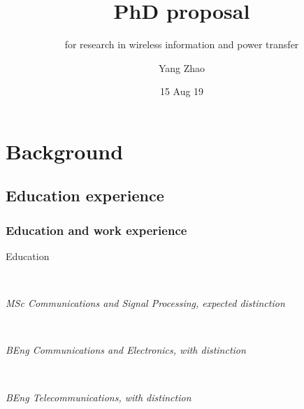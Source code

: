 \documentclass{beamer}
\title{PhD proposal}
\subtitle{for research in wireless information and power transfer}
\author{Yang Zhao}
\date{15 Aug 19}
\begin{document}
\frame{\titlepage}



\section{Background}
\subsection{Education experience}

\begin{frame}
\frametitle{Education and work experience}

\begin{block}{Education}

\begin{minipage}[t]{0.7\textwidth}
\end{minipage}
~
\begin{minipage}[t]{0.2\textwidth}
\end{minipage}

\textit{MSc Communications and Signal Processing, expected distinction} \\

\begin{minipage}[t]{0.7\textwidth}
\end{minipage}
~
\begin{minipage}[t]{0.2\textwidth}
\end{minipage}

\textit{BEng Communications and Electronics, with distinction} \\

\begin{minipage}[t]{0.7\textwidth}
\end{minipage}
~
\begin{minipage}[t]{0.2\textwidth}
\end{minipage}

\textit{BEng Telecommunications, with distinction}
\end{block}

\end{frame}
\end{document}
